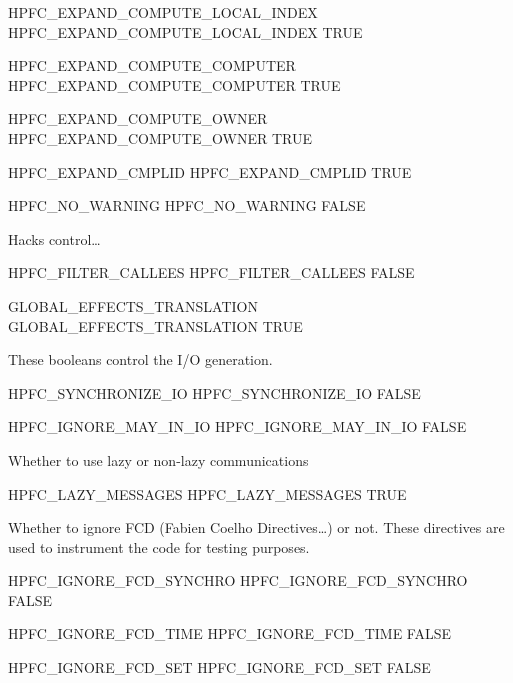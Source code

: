 \documentclass[a4paper]{report}
\begin{document}
\begin{PipsProp}{HPFC_EXPAND_COMPUTE_LOCAL_INDEX}
HPFC_EXPAND_COMPUTE_LOCAL_INDEX TRUE
\end{PipsProp}
\begin{PipsProp}{HPFC_EXPAND_COMPUTE_COMPUTER}
HPFC_EXPAND_COMPUTE_COMPUTER TRUE
\end{PipsProp}
\begin{PipsProp}{HPFC_EXPAND_COMPUTE_OWNER}
HPFC_EXPAND_COMPUTE_OWNER TRUE
\end{PipsProp}
\begin{PipsProp}{HPFC_EXPAND_CMPLID}
HPFC_EXPAND_CMPLID TRUE
\end{PipsProp}
\begin{PipsProp}{HPFC_NO_WARNING}
HPFC_NO_WARNING FALSE
\end{PipsProp}

   Hacks control\ldots

\begin{PipsProp}{HPFC_FILTER_CALLEES}
HPFC_FILTER_CALLEES FALSE
\end{PipsProp}
\begin{PipsProp}{GLOBAL_EFFECTS_TRANSLATION}
GLOBAL_EFFECTS_TRANSLATION TRUE
\end{PipsProp}

  These booleans control the I/O generation.

\begin{PipsProp}{HPFC_SYNCHRONIZE_IO}
HPFC_SYNCHRONIZE_IO FALSE
\end{PipsProp}
\begin{PipsProp}{HPFC_IGNORE_MAY_IN_IO}
HPFC_IGNORE_MAY_IN_IO FALSE
\end{PipsProp}

  Whether to use lazy or non-lazy communications

\begin{PipsProp}{HPFC_LAZY_MESSAGES}
HPFC_LAZY_MESSAGES TRUE
\end{PipsProp}

Whether to ignore FCD (Fabien Coelho Directives\ldots) or not. These
directives are used to instrument the code for testing purposes.

\begin{PipsProp}{HPFC_IGNORE_FCD_SYNCHRO}
HPFC_IGNORE_FCD_SYNCHRO FALSE
\end{PipsProp}
\begin{PipsProp}{HPFC_IGNORE_FCD_TIME}
HPFC_IGNORE_FCD_TIME FALSE
\end{PipsProp}
\begin{PipsProp}{HPFC_IGNORE_FCD_SET}
HPFC_IGNORE_FCD_SET FALSE
\end{PipsProp}
\end{document}
